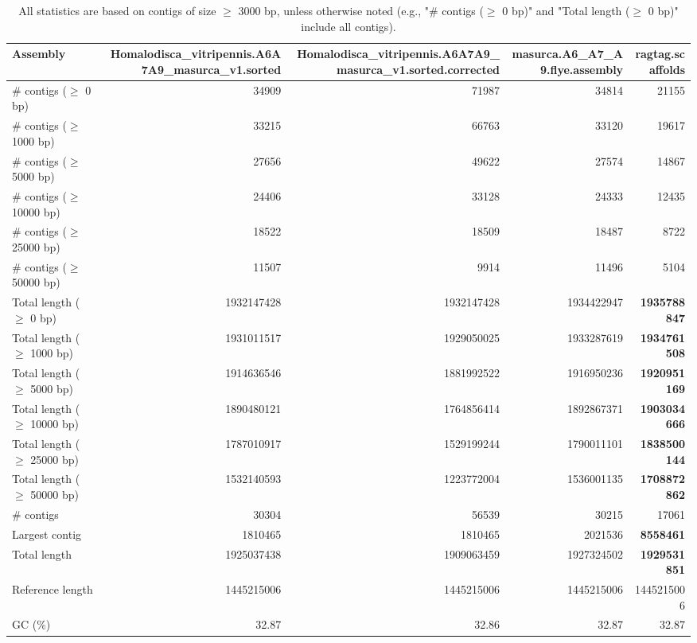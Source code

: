 \documentclass[12pt,a4paper]{article}
\begin{document}
\begin{table}[ht]
\begin{center}
\caption{All statistics are based on contigs of size $\geq$ 3000 bp, unless otherwise noted (e.g., "\# contigs ($\geq$ 0 bp)" and "Total length ($\geq$ 0 bp)" include all contigs).}
\begin{tabular}{|l*{4}{|r}|}
\hline
Assembly & Homalodisca\_vitripennis.A6A7A9\_masurca\_v1.sorted & Homalodisca\_vitripennis.A6A7A9\_masurca\_v1.sorted.corrected & masurca.A6\_A7\_A9.flye.assembly & ragtag.scaffolds \\ \hline
\# contigs ($\geq$ 0 bp) & 34909 & 71987 & 34814 & 21155 \\ \hline
\# contigs ($\geq$ 1000 bp) & 33215 & 66763 & 33120 & 19617 \\ \hline
\# contigs ($\geq$ 5000 bp) & 27656 & 49622 & 27574 & 14867 \\ \hline
\# contigs ($\geq$ 10000 bp) & 24406 & 33128 & 24333 & 12435 \\ \hline
\# contigs ($\geq$ 25000 bp) & 18522 & 18509 & 18487 & 8722 \\ \hline
\# contigs ($\geq$ 50000 bp) & 11507 & 9914 & 11496 & 5104 \\ \hline
Total length ($\geq$ 0 bp) & 1932147428 & 1932147428 & 1934422947 & {\bf 1935788847} \\ \hline
Total length ($\geq$ 1000 bp) & 1931011517 & 1929050025 & 1933287619 & {\bf 1934761508} \\ \hline
Total length ($\geq$ 5000 bp) & 1914636546 & 1881992522 & 1916950236 & {\bf 1920951169} \\ \hline
Total length ($\geq$ 10000 bp) & 1890480121 & 1764856414 & 1892867371 & {\bf 1903034666} \\ \hline
Total length ($\geq$ 25000 bp) & 1787010917 & 1529199244 & 1790011101 & {\bf 1838500144} \\ \hline
Total length ($\geq$ 50000 bp) & 1532140593 & 1223772004 & 1536001135 & {\bf 1708872862} \\ \hline
\# contigs & 30304 & 56539 & 30215 & 17061 \\ \hline
Largest contig & 1810465 & 1810465 & 2021536 & {\bf 8558461} \\ \hline
Total length & 1925037438 & 1909063459 & 1927324502 & {\bf 1929531851} \\ \hline
Reference length & 1445215006 & 1445215006 & 1445215006 & 1445215006 \\ \hline
GC (\%) & 32.87 & 32.86 & 32.87 & 32.87 \\ \hline

\end{tabular}
\end{center}
\end{table}
\end{document}
